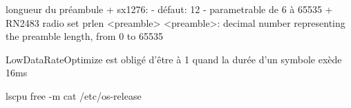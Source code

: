 longueur du préambule
    + sx1276: 
        - défaut: 12
        - parametrable de 6 à 65535
    + RN2483
        radio set prlen <preamble>
        <preamble>: decimal number representing the preamble length, from 0 to 65535


LowDataRateOptimize est obligé d'être à 1 quand la durée d'un symbole exède 16ms

lscpu
free -m
cat /etc/os-release